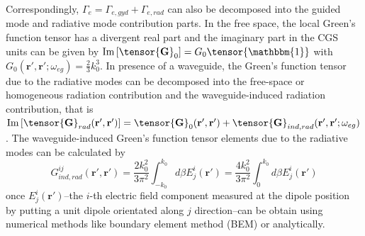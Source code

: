 \documentclass[preprint,aps,pra,onecolumn,superscriptaddress]{revtex4-1} %
\def\br{\mathbf{r}}
\begin{document}
\begin{appendix}
Correspondingly, $ \Gamma_e=\Gamma_{e,gyd}+\Gamma_{e,rad} $ can also be decomposed into the guided mode and radiative mode contribution parts. 
In the free space, the local Green's function tensor has a divergent real part and the imaginary part in the CGS units can be given by 
$\mathrm{Im}\left[\tensor{\mathbf{G}}_0\right]=G_0\tensor{\mathbbm{1}}$ with $G_0(\mathbf{r}',\mathbf{r}';\omega_{eg})=\frac{2}{3}k_0^3$.
In presence of a waveguide, the Green's function tensor due to the radiative modes can be decomposed into the free-space or homogeneous radiation contribution and the waveguide-induced radiation contribution, that is $ \mathrm{Im}\left[\tensor{\mathbf{G}}_{rad}(\br',\br')\right]=\tensor{\mathbf{G}}_0(\br',\br')+\tensor{\mathbf{G}}_{ind,rad}(\br',\br';\omega_{eg}) $.
The waveguide-induced Green's function tensor elements due to the radiative modes can be calculated by
$$G_{ind,rad}^{ij}(\mathbf{r}',\mathbf{r}')=\frac{2k_0^2}{3\pi^2}\int_{-k_0}^{k_0} d\beta E_j^i(\mathbf{r}')=\frac{4k_0^2}{3\pi^2}\int_{0}^{k_0} d\beta E_j^i(\mathbf{r}')$$
once $ E_j^i(\mathbf{r}') $--the $i$-th electric field component measured at the dipole position by putting a unit dipole orientated along $j$ direction--can be obtain using numerical methods like boundary element method (BEM) or analytically.


\end{appendix}
\end{document}
